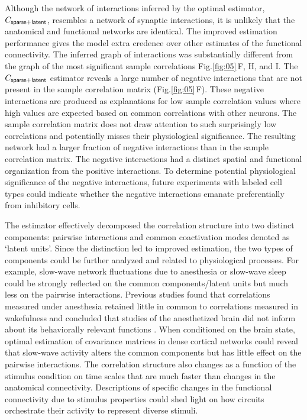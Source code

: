 \documentclass[10pt]{article}
\newcommand{\sq}[1]{\lq#1\rq}
\newcommand{\figref}[2]{Fig.\;\ref{fig:#1}\,#2}
\begin{document}
Although the network of interactions inferred by the optimal estimator, $C_{\sf sparse+latent}$, resembles a network of synaptic interactions, it is unlikely that the anatomical and functional networks are identical.  The improved estimation performance gives the model extra credence over other estimates of the functional connectivity.  The inferred graph of interactions was substantially different from the graph of the most significant sample correlations \figref{05}{F, H, and I}.  The $C_{\sf sparse+latent}$ estimator reveals a large number of negative interactions that are not present in the sample correlation matrix (\figref{05}{F}).  These negative interactions are produced as explanations for low sample correlation values where high values are expected based on common correlations with other neurons.  The sample correlation matrix does not draw attention to such surprisingly low correlations and potentially misses their physiological significance.  The resulting network had a larger fraction of negative interactions than in the sample correlation matrix. The negative interactions had a distinct spatial and functional organization from the positive interactions.  To determine potential physiological significance of the negative interactions, future experiments with labeled cell types could indicate whether the negative interactions emanate preferentially from inhibitory cells. 

The estimator effectively decomposed the correlation structure into two distinct components: pairwise interactions and common coactivation modes denoted as \sq{latent units}.   Since the distinction led to improved estimation, the two types of components could be further analyzed and related to physiological processes.  For example, slow-wave network fluctuations due to anesthesia or slow-wave sleep could be strongly reflected on the common components/latent units but much less on the pairwise interactions. Previous studies found that correlations measured under anesthesia retained little in common to correlations measured in wakefulness and concluded that studies of the anesthetized brain did not inform about its behaviorally relevant functions \cite{Greenberg:2008}.  When conditioned on the brain state, optimal estimation of covariance matrices in dense cortical networks could reveal that slow-wave activity alters the common components but has little effect on the pairwise interactions.  The correlation structure also changes as a function of the stimulus condition \cite{Cotton:2013} on time scales that are much faster than changes in the anatomical connectivity. Descriptions of specific changes in the functional connectivity due to stimulus properties could shed light on how circuits orchestrate their activity to represent diverse stimuli.
\end{document}
